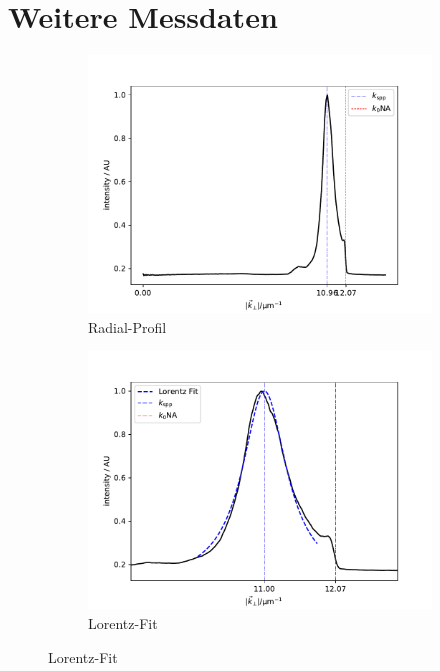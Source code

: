 \documentclass[titlepage,  ngerman]{article}
\begin{document}
	\section{Weitere Messdaten}
	\begin{figure}[h!]
		\label{fig:dirt_measure}
		\centering
		\begin{subfigure}[b]{0.5\textwidth}
			\centering
			\includegraphics[width=\textwidth]{figures/dirt_radial.pdf}
			\caption{Radial-Profil}
			\label{fig:dirt_radial}
		\end{subfigure}
		\hfill
		\begin{subfigure}[b]{0.49\textwidth}
			\centering
			\includegraphics[width=\textwidth]{figures/dirt_lorentz.pdf}
			\caption{Lorentz-Fit}
			\label{fig:dirt_lorentz}
		\end{subfigure}
	

\end{figure}
\end{document}
